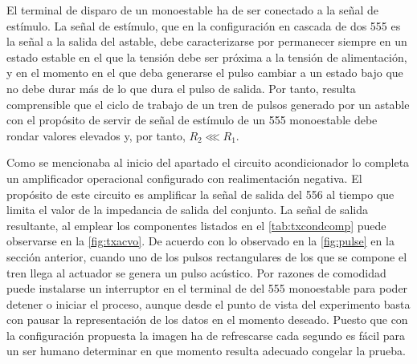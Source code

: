 El terminal de disparo de un monoestable ha de ser conectado a la señal de
estímulo. La señal de estímulo, que en la configuración en cascada de dos
555 es la señal a la salida del astable, debe caracterizarse por permanecer
siempre en un estado estable en el que la tensión debe ser próxima a la
tensión de alimentación, y en el momento en el que deba generarse el pulso
cambiar a un estado bajo que no debe durar más de lo que dura el pulso de
salida. Por tanto, resulta comprensible que el ciclo de trabajo de un tren
de pulsos generado por un astable con el propósito de servir de señal de
estímulo de un 555 monoestable debe rondar valores elevados y, por tanto,
$R_2 \lll R_1$.

Como se mencionaba al inicio del apartado el circuito acondicionador lo
completa un amplificador operacional configurado con realimentación
negativa. El propósito de este circuito es amplificar la señal de salida
del 556 al tiempo que limita el valor de la impedancia de salida del
conjunto. La señal de salida resultante, al emplear los componentes
listados en el \cref{tab:txcondcomp} puede observarse en la
\cref{fig:txacvo}. De acuerdo con lo observado en la \cref{fig:pulse} en la
sección anterior, cuando uno de los pulsos rectangulares de los que se
compone el tren llega al actuador se genera un pulso acústico. Por razones
de comodidad puede instalarse un interruptor en el terminal de 
del 555 monoestable para poder detener o iniciar el proceso, aunque desde
el punto de vista del experimento basta con pausar la representación de los
datos en el momento deseado. Puesto que con la configuración propuesta la
imagen ha de refrescarse cada segundo es fácil para un ser humano
determinar en que momento resulta adecuado congelar la prueba.

